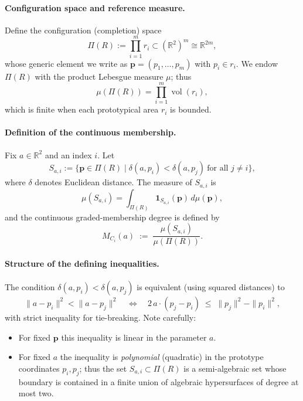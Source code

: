 \documentclass{article}
\begin{document}
\paragraph{Configuration space and reference measure.}
Define the configuration (completion) space
\[
\Pi(R) := \prod_{i=1}^m r_i \subset (\mathbb{R}^2)^m \cong \mathbb{R}^{2m},
\]
whose generic element we write as \(\mathbf p=(p_1,\dots,p_m)\) with \(p_i\in r_i\). We endow \(\Pi(R)\) with the product Lebesgue measure \(\mu\); thus
\[
\mu(\Pi(R)) = \prod_{i=1}^m \operatorname{vol}(r_i),
\]
which is finite when each prototypical area \(r_i\) is bounded.

\paragraph{Definition of the continuous membership.}
Fix \(a\in\mathbb{R}^2\) and an index \(i\). Let
\[
S_{a,i} := \{\mathbf p\in\Pi(R)\mid \delta(a,p_i) < \delta(a,p_j)\ \text{for all } j\neq i\},
\]
where \(\delta\) denotes Euclidean distance. The measure of \(S_{a,i}\) is
\[
\mu(S_{a,i})=\int_{\Pi(R)} \mathbf{1}_{S_{a,i}}(\mathbf p)\,d\mu(\mathbf p),
\]
and the continuous graded-membership degree is defined by
\[
M_{C_i}(a) \;:=\; \frac{\mu(S_{a,i})}{\mu(\Pi(R))}.
\]

\paragraph{Structure of the defining inequalities.}
The condition \(\delta(a,p_i) < \delta(a,p_j)\) is equivalent (using squared distances) to
\[
\|a-p_i\|^2 < \|a-p_j\|^2
\quad\Longleftrightarrow\quad
2\,a\cdot(p_j-p_i)\;\le\;\|p_j\|^2-\|p_i\|^2,
\]
with strict inequality for tie-breaking. Note carefully:
\begin{itemize}
  \item For fixed \(\mathbf p\) this inequality is linear in the parameter \(a\).
  \item For fixed \(a\) the inequality is \emph{polynomial} (quadratic) in the prototype coordinates \(p_i,p_j\); thus the set \(S_{a,i}\subset\Pi(R)\) is a semi-algebraic set whose boundary is contained in a finite union of algebraic hypersurfaces of degree at most two.
\end{itemize}
\end{document}
